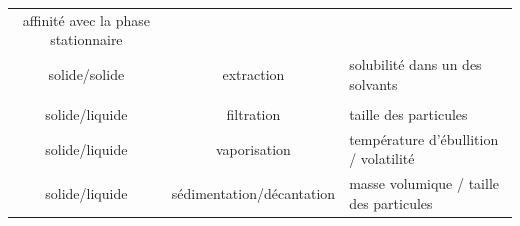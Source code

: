 \documentclass[
  11pt,
  french,
  a4paper,
  openany]{book}
\begin{document}
\begin{longtable}[]{@{}ccl@{}}
\begin{minipage}[t]{0.44\columnwidth}
affinité avec la phase stationnaire\strut
\end{minipage}\tabularnewline
\begin{minipage}[t]{0.19\columnwidth}\centering
solide/solide\strut
\end{minipage} & \begin{minipage}[t]{0.28\columnwidth}\centering
extraction\strut
\end{minipage} & \begin{minipage}[t]{0.44\columnwidth}\raggedright
solubilité dans un des solvants\strut
\end{minipage}\tabularnewline
\begin{minipage}[t]{0.19\columnwidth}\centering
\strut
\end{minipage} & \begin{minipage}[t]{0.28\columnwidth}\centering
\strut
\end{minipage} & \begin{minipage}[t]{0.44\columnwidth}\raggedright
\strut
\end{minipage}\tabularnewline
\begin{minipage}[t]{0.19\columnwidth}\centering
solide/liquide\strut
\end{minipage} & \begin{minipage}[t]{0.28\columnwidth}\centering
filtration\strut
\end{minipage} & \begin{minipage}[t]{0.44\columnwidth}\raggedright
taille des particules\strut
\end{minipage}\tabularnewline
\begin{minipage}[t]{0.19\columnwidth}\centering
solide/liquide\strut
\end{minipage} & \begin{minipage}[t]{0.28\columnwidth}\centering
vaporisation\strut
\end{minipage} & \begin{minipage}[t]{0.44\columnwidth}\raggedright
température d'ébullition / volatilité\strut
\end{minipage}\tabularnewline
\begin{minipage}[t]{0.19\columnwidth}\centering
solide/liquide\strut
\end{minipage} & \begin{minipage}[t]{0.28\columnwidth}\centering
sédimentation/décantation\strut
\end{minipage} & \begin{minipage}[t]{0.44\columnwidth}\raggedright
masse volumique / taille des particules\strut

\end{minipage}
\end{longtable}
\end{document}
